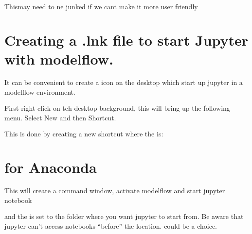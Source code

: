 \documentclass[letterpaper,10pt,english]{jupyterBook}
\begin{document}
\sphinxAtStartPar
{}

\sphinxAtStartPar
Thismay need to ne junked if we cant make it more user friendly


\section{Creating a .lnk file to start Jupyter with modelflow.}
\label{\detokenize{content/04_PythonEssentials/Intro_Jupyter_notebook:creating-a-lnk-file-to-start-jupyter-with-modelflow}}
\sphinxAtStartPar
It can be convenient to create a icon on the desktop which start up jupyter in a modelflow environment.

\sphinxAtStartPar
First right click on teh desktop background, this will bring up the following menu.  Select New and then Shortcut.

\sphinxAtStartPar
This is done by creating a new shortcut where the  is:


\section{for Anaconda}
\label{\detokenize{content/04_PythonEssentials/Intro_Jupyter_notebook:for-anaconda}}
\begin{sphinxVerbatim}[commandchars=\\\{\}]
\PYGZbs{}\PYGZbs{}  \PYGZbs{}\PYGZbs{}\PYGZbs{} \PYGZbs{}\PYGZbs{}\PYGZbs{} 
\end{sphinxVerbatim}

\sphinxAtStartPar
This will create a command window, activate modelflow and start jupyter notebook

\sphinxAtStartPar
and the   is set to the folder where you want jupyter to start from. 
Be aware that jupyter can’t access notebooks “before” the  location.  could be a choice.
\end{document}
